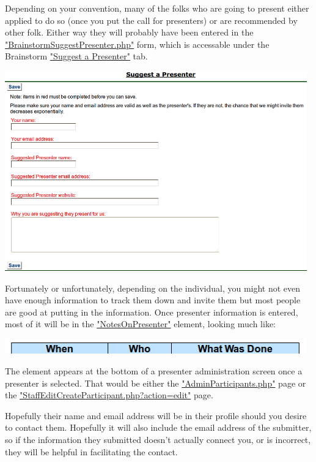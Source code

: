 \documentclass[captions=tablesignature]{scrartcl}
\begin{document}
Depending on your convention, many of the folks who are going to
present either applied to do so (once you put the call for
presenters) or are recommended by other folk.  Either way they
will probably have been entered in the
\href{../webpages/BrainstormSuggestPresenter.php}{"BrainstormSuggestPresenter.php"} form, which is accessable under
the Brainstorm \href{../webpages/BrainstormSuggestPresenter.php}{"Suggest a Presenter"} tab.

\includegraphics[width=0.98\textwidth]{./Images/Brainstorm_Suggest_Presenter.png}

Fortunately or unfortunately, depending on the individual, you
might not even have enough information to track them down and
invite them but most people are good at putting in the
information.  Once presenter information is entered, most of it
will be in the \href{../webpages/NoteOnParticipant.php}{"NotesOnPresenter"} element, looking much like:

\includegraphics[width=0.98\textwidth]{./Images/Notes_On_Participant.png}

The element appears at the bottom of a presenter administration
screen once a presenter is selected.  That would be either the
\href{../webpages/AdminParticipants.php}{"AdminParticipants.php"} page or the
\href{../webpages/StaffEditCreateParticipant.php?action=edit}{"StaffEditCreateParticipant.php?action=edit"} page.

Hopefully their name and email address will be in their profile
should you desire to contact them.  Hopefully it will also include
the email address of the submitter, so if the information they
submitted doesn't actually connect you, or is incorrect, they will
be helpful in facilitating the contact.
\end{document}
